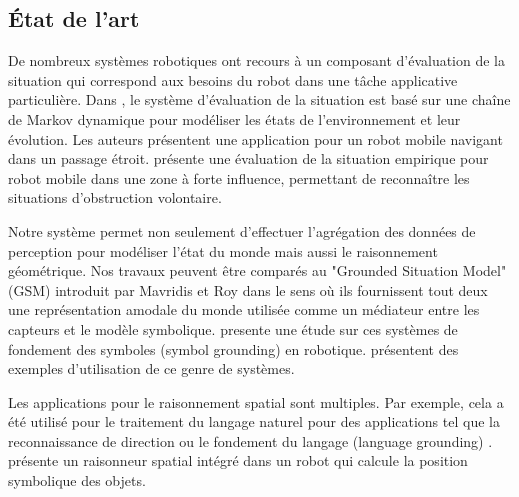 \documentclass[a4paper,11pt,twoside]{StyleThese}
\begin{document}
\subsection{État de l'art}

De nombreux systèmes robotiques ont recours à un composant d'évaluation de la situation qui correspond aux besoins du robot dans une tâche applicative particulière. Dans \cite{beck2011}, le système d'évaluation de la situation est basé sur une chaîne de Markov dynamique pour modéliser les états de l'environnement et leur évolution. Les auteurs présentent une application pour un robot mobile navigant dans un passage étroit.
\cite{Kluge01situationassessment} présente une évaluation de la situation empirique pour robot mobile dans une zone à forte influence, permettant de reconnaître les situations d'obstruction volontaire.

Notre système permet non seulement d'effectuer l'agrégation des données de perception pour modéliser l'état du monde mais aussi le raisonnement géométrique. 
Nos travaux peuvent être comparés au "Grounded Situation Model" (GSM) introduit par Mavridis et Roy \cite{Mavridis2005} dans le sens où ils fournissent tout deux une représentation amodale du monde utilisée comme un médiateur entre les capteurs et le modèle symbolique. \cite{Coradeschi2013} presente une étude sur ces systèmes de fondement des symboles (symbol grounding) en robotique. \cite{Daoutis2009} \cite{Lemaignan2011}
présentent des exemples d'utilisation de ce genre de systèmes.

Les applications pour le raisonnement spatial \cite{OKeefe1999} sont multiples. Par exemple, cela a été utilisé pour le traitement du langage naturel pour des applications tel que la reconnaissance de direction \cite{Kollar10,Matuszek10}
ou le fondement du langage (language grounding) \cite{Tellex10}. \cite{Skubic2004} présente un raisonneur spatial intégré dans un robot qui calcule la position symbolique des objets.


\end{document}
